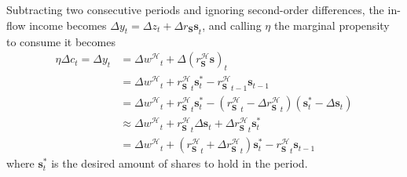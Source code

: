 \documentclass[a4paper, headings=standardclasses]{scrartcl}
\begin{document}
Subtracting two consecutive periods and ignoring second-order differences, the in-flow income becomes ${\Delta y}_t = {\Delta z}_t + {\Delta r_\mathbf{S} \mathbf{s} }_t$, and calling $\eta$ the marginal propensity to consume it becomes
\begin{align*}
    \eta {\Delta c}_t = {\Delta y}_t & = {\Delta w^{\mathcal{H}}}_t + {\Delta (r^{\mathcal{H}}_\mathbf{S} \mathbf{s})}_t                                                                                                                        \\
                                     & = {\Delta w^{\mathcal{H}}}_t + {r^{\mathcal{H}}_\mathbf{S}}_t \mathbf{s}^*_t - {r^{\mathcal{H}}_\mathbf{S}}_{t-1} \mathbf{s}_{t-1}                                                                       \\
                                     & = {\Delta w^{\mathcal{H}}}_t + {r^{\mathcal{H}}_\mathbf{S}}_t \mathbf{s}^*_t - ({r^{\mathcal{H}}_\mathbf{S}}_{t} - {\Delta r^{\mathcal{H}}_\mathbf{S}}_{t}) (\mathbf{s}^*_{t} - {\Delta \mathbf{s}}_{t}) \\
                                     & \approx {\Delta w^{\mathcal{H}}}_t + {r^{\mathcal{H}}_\mathbf{S}}_t {\Delta \mathbf{s}}_t + {\Delta r^{\mathcal{H}}_\mathbf{S}}_{t} \mathbf{s}^*_{t}                                                     \\
                                     & = {\Delta w^{\mathcal{H}}}_t + ({r^{\mathcal{H}}_\mathbf{S}}_t + {\Delta r^{\mathcal{H}}_\mathbf{S}}_{t})\mathbf{s}^*_t - {r^{\mathcal{H}}_\mathbf{S}}_{t} \mathbf{s}_{t-1}
\end{align*}
where $\mathbf{s}^*_t$ is the desired amount of shares to hold in the period.
\end{document}
